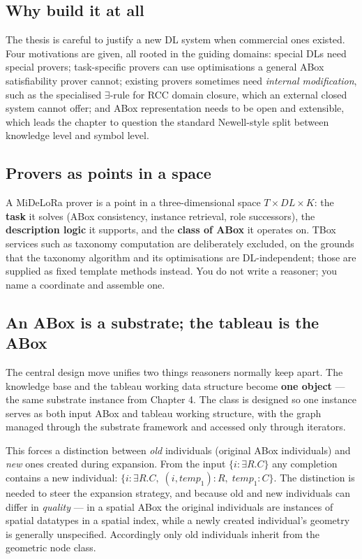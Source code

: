 \documentclass[11pt,a4paper,DIV=12,parskip=half]{scrartcl}
\begin{document}
\subsection{Why build it at all}

The thesis is careful to justify a new DL system when commercial ones existed.
Four motivations are given, all rooted in the guiding domains: special DLs need
special provers; task-specific provers can use optimisations a general ABox
satisfiability prover cannot; existing provers sometimes need \emph{internal
modification}, such as the specialised $\exists$-rule for RCC domain closure,
which an external closed system cannot offer; and ABox representation needs to
be open and extensible, which leads the chapter to question the standard
Newell-style split between knowledge level and symbol level.

\subsection{Provers as points in a space}

A MiDeLoRa prover is a point in a three-dimensional space $T \times DL \times K$:
the \textbf{task} it solves (ABox consistency, instance retrieval, role
successors), the \textbf{description logic} it supports, and the \textbf{class of
ABox} it operates on. TBox services such as taxonomy computation are deliberately
excluded, on the grounds that the taxonomy algorithm and its optimisations are
DL-independent; those are supplied as fixed template methods instead. You do not
write a reasoner; you name a coordinate and assemble one.

\subsection{An ABox is a substrate; the tableau is the ABox}

The central design move unifies two things reasoners normally keep apart. The
knowledge base and the tableau working data structure become \textbf{one
object} --- the same substrate instance from Chapter 4. The class is designed so
one instance serves as both input ABox and tableau working structure, with the
graph managed through the substrate framework and accessed only through
iterators.

This forces a distinction between \emph{old} individuals (original ABox
individuals) and \emph{new} ones created during expansion. From the input
$\{ i : \exists R.C \}$ any completion contains a new individual: $\{ i :
\exists R.C,\; (i, \mathit{temp}_1) : R,\; \mathit{temp}_1 : C \}$. The
distinction is needed to steer the expansion strategy, and because old and new
individuals can differ in \emph{quality} --- in a spatial ABox the original
individuals are instances of spatial datatypes in a spatial index, while a newly
created individual's geometry is generally unspecified. Accordingly only old
individuals inherit from the geometric node class.
\end{document}
